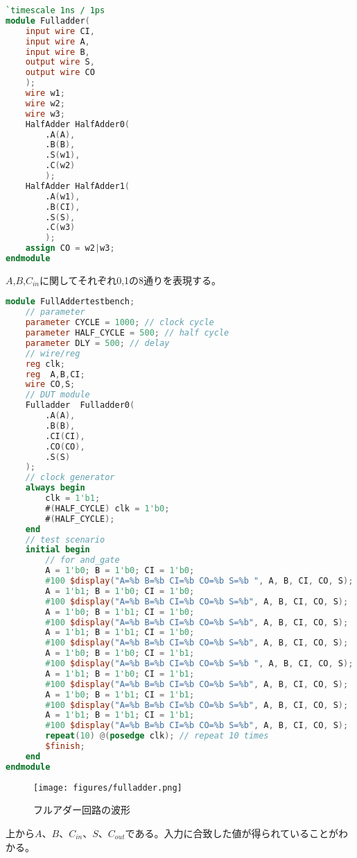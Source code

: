 \documentclass{ltjsarticle}
\begin{document}
\begin{lstlisting}[caption=フルアダーデザイン,language=verilog]
`timescale 1ns / 1ps
module Fulladder(
    input wire CI,
    input wire A,
    input wire B,
    output wire S,
    output wire CO
    );
    wire w1;
    wire w2;
    wire w3;
    HalfAdder HalfAdder0(
        .A(A),
        .B(B),
        .S(w1),
        .C(w2)
        );
    HalfAdder HalfAdder1(
        .A(w1),
        .B(CI),
        .S(S),
        .C(w3)
        );
    assign CO = w2|w3;
endmodule
\end{lstlisting}
$A$,$B$,$C_{in}$に関してそれぞれ0,1の8通りを表現する。
\begin{lstlisting}[caption=フルアダーテストベンチ,language=verilog]
module FullAddertestbench;
    // parameter
    parameter CYCLE = 1000; // clock cycle
    parameter HALF_CYCLE = 500; // half cycle
    parameter DLY = 500; // delay
    // wire/reg
    reg clk;
    reg  A,B,CI;
    wire CO,S;
    // DUT module
    Fulladder  Fulladder0(
        .A(A),
        .B(B),
        .CI(CI),
        .CO(CO),
        .S(S)
    );    
    // clock generator
    always begin
        clk = 1'b1;
        #(HALF_CYCLE) clk = 1'b0;
        #(HALF_CYCLE);
    end
    // test scenario
    initial begin
        // for and_gate
        A = 1'b0; B = 1'b0; CI = 1'b0;
        #100 $display("A=%b B=%b CI=%b CO=%b S=%b ", A, B, CI, CO, S);
        A = 1'b1; B = 1'b0; CI = 1'b0;
        #100 $display("A=%b B=%b CI=%b CO=%b S=%b", A, B, CI, CO, S); 
        A = 1'b0; B = 1'b1; CI = 1'b0;
        #100 $display("A=%b B=%b CI=%b CO=%b S=%b", A, B, CI, CO, S);  
        A = 1'b1; B = 1'b1; CI = 1'b0;
        #100 $display("A=%b B=%b CI=%b CO=%b S=%b", A, B, CI, CO, S);
        A = 1'b0; B = 1'b0; CI = 1'b1;
        #100 $display("A=%b B=%b CI=%b CO=%b S=%b ", A, B, CI, CO, S);
        A = 1'b1; B = 1'b0; CI = 1'b1;
        #100 $display("A=%b B=%b CI=%b CO=%b S=%b", A, B, CI, CO, S); 
        A = 1'b0; B = 1'b1; CI = 1'b1;
        #100 $display("A=%b B=%b CI=%b CO=%b S=%b", A, B, CI, CO, S);  
        A = 1'b1; B = 1'b1; CI = 1'b1;
        #100 $display("A=%b B=%b CI=%b CO=%b S=%b", A, B, CI, CO, S);
        repeat(10) @(posedge clk); // repeat 10 times
        $finish;
    end
endmodule
\end{lstlisting}
\begin{figure}[H]
    \begin{center}
        \texttt{[image: figures/fulladder.png]}
        \caption{フルアダー回路の波形}
    \end{center}
\end{figure}
上から$A$、$B$、$C_{in}$、$S$、$C_{out}$である。入力に合致した値が得られていることがわかる。
\end{document}
